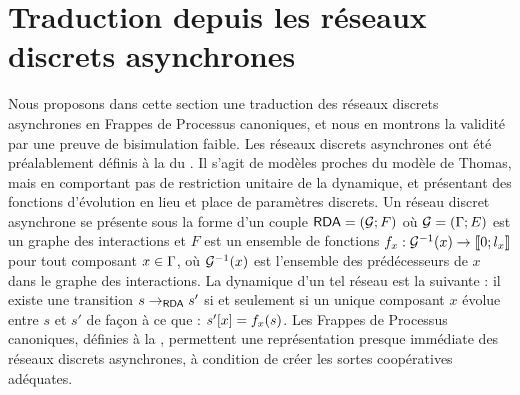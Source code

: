 
\section{Traduction depuis les réseaux discrets asynchrones}

Nous proposons dans cette section une traduction des réseaux discrets asynchrones
en Frappes de Processus canoniques, et nous en montrons la validité
par une preuve de bisimulation faible.
Les réseaux discrets asynchrones ont été préalablement définis à la 
du .
Il s'agit de modèles proches du modèle de Thomas, mais en comportant pas de restriction unitaire
de la dynamique, et présentant des fonctions d'évolution en lieu et place de paramètres discrets.
Un réseau discret asynchrone se présente sous la forme d'un couple $\mathsf{RDA} = (\mathcal{G}; F)$
où $\mathcal{G} = (\mathrm{\Gamma}; E)$ est un graphe des interactions
et $F$ est un ensemble de fonctions $f_x : \mathcal{G}^{-1}(x) \rightarrow \mathopen{\llbracket}0\mathclose{};l_x\mathclose{\rrbracket}$
pour tout composant $x \in \mathrm{\Gamma}$,
où $\mathcal{G}^{-1}(x)$ est l'ensemble des prédécesseurs de $x$ dans le graphe des interactions.
La dynamique d'un tel réseau est la suivante : il existe une transition $s \rightarrow_{\mathsf{RDA}} s'$
si et seulement si un unique composant $x$ évolue entre $s$ et $s'$
de façon à ce que : ${s'[x]} = f_x(s)$.
Les Frappes de Processus canoniques, définies à la ,
permettent une représentation presque immédiate des réseaux discrets asynchrones,
à condition de créer les sortes coopératives adéquates.

\myskip

% 

